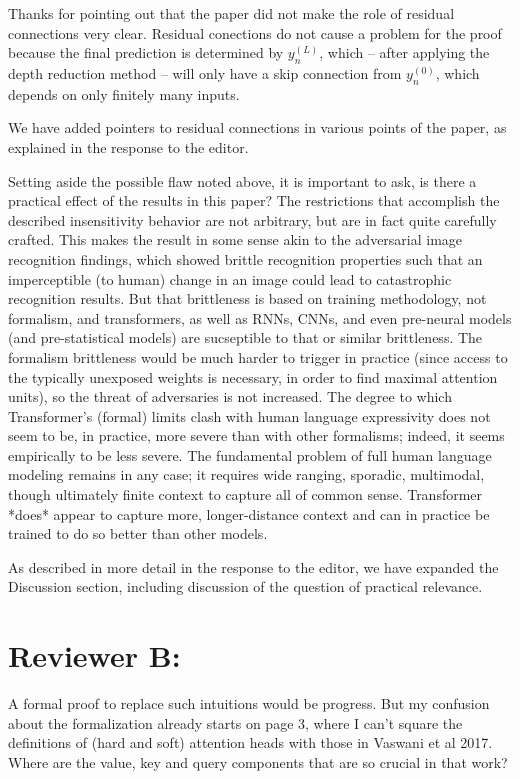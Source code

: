 \documentclass[11pt,a4paper]{article}
\newcommand\response[1]{{\color{blue}#1}}
\begin{document}
\response{Thanks for pointing out that the paper did not make the role of residual connections very clear. Residual conections do not cause a problem for the proof because the final prediction is determined by $y_n^{(L)}$, which -- after applying the depth reduction method -- will only have a skip connection from $y_n^{(0)}$, which depends on only finitely many inputs.}

\response{We have added pointers to residual connections in various points of the paper, as explained in the response to the editor. }


Setting aside the possible flaw noted above, it is important to ask, is
there a practical effect of the results in this paper? The
restrictions that accomplish the described insensitivity behavior are
not arbitrary, but are in fact quite carefully crafted. This makes the
result in some sense akin to the adversarial image recognition
findings, which showed brittle recognition properties such that an
imperceptible (to human) change in an image could lead to
catastrophic recognition results. But that brittleness is based on
training methodology, not formalism, and transformers, as well as
RNNs, CNNs, and even pre-neural models (and pre-statistical models)
are sucseptible to that or similar brittleness. The formalism
brittleness would be much harder to trigger in practice (since access
to the typically unexposed weights is necessary, in order to find
maximal attention units), so the threat
of adversaries is not increased. The degree to which Transformer's
(formal) limits clash with human language expressivity does not seem
to be, in practice, more severe than with other formalisms; indeed, it
seems empirically to be less severe. The fundamental problem of full
human language modeling remains in any case; it requires wide ranging,
sporadic, multimodal, though ultimately finite context to capture all
of common sense. Transformer *does* appear to capture more,
longer-distance context and can in practice be trained to do so better
than other models.

\response{As described in more detail in the response to the editor, we have expanded the Discussion section, including discussion of the question of practical relevance.}

\section{Reviewer B:}


A formal proof to replace such intuitions would be progress. But my
confusion about the formalization already starts on page 3, where I can’t
square the definitions of (hard and soft) attention heads with those in
Vaswani et al 2017. Where are the value, key and query components that are
so crucial in that work?
\end{document}
